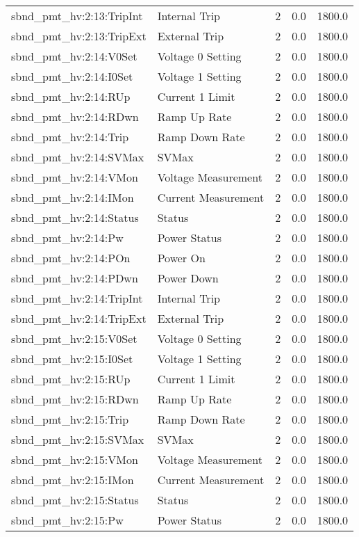 \begin{center}
\begin{longtable}{l | l l l l }
sbnd\_pmt\_hv:2:13:TripInt & Internal Trip & 2 & 0.0 & 1800.0\\ 
sbnd\_pmt\_hv:2:13:TripExt & External Trip & 2 & 0.0 & 1800.0\\ 
sbnd\_pmt\_hv:2:14:V0Set & Voltage 0 Setting & 2 & 0.0 & 1800.0\\ 
sbnd\_pmt\_hv:2:14:I0Set & Voltage 1 Setting & 2 & 0.0 & 1800.0\\ 
sbnd\_pmt\_hv:2:14:RUp & Current 1 Limit & 2 & 0.0 & 1800.0\\ 
sbnd\_pmt\_hv:2:14:RDwn & Ramp Up Rate & 2 & 0.0 & 1800.0\\ 
sbnd\_pmt\_hv:2:14:Trip & Ramp Down Rate & 2 & 0.0 & 1800.0\\ 
sbnd\_pmt\_hv:2:14:SVMax & SVMax & 2 & 0.0 & 1800.0\\ 
sbnd\_pmt\_hv:2:14:VMon & Voltage Measurement & 2 & 0.0 & 1800.0\\ 
sbnd\_pmt\_hv:2:14:IMon & Current Measurement & 2 & 0.0 & 1800.0\\ 
sbnd\_pmt\_hv:2:14:Status & Status & 2 & 0.0 & 1800.0\\ 
sbnd\_pmt\_hv:2:14:Pw & Power Status & 2 & 0.0 & 1800.0\\ 
sbnd\_pmt\_hv:2:14:POn & Power On & 2 & 0.0 & 1800.0\\ 
sbnd\_pmt\_hv:2:14:PDwn & Power Down & 2 & 0.0 & 1800.0\\ 
sbnd\_pmt\_hv:2:14:TripInt & Internal Trip & 2 & 0.0 & 1800.0\\ 
sbnd\_pmt\_hv:2:14:TripExt & External Trip & 2 & 0.0 & 1800.0\\ 
sbnd\_pmt\_hv:2:15:V0Set & Voltage 0 Setting & 2 & 0.0 & 1800.0\\ 
sbnd\_pmt\_hv:2:15:I0Set & Voltage 1 Setting & 2 & 0.0 & 1800.0\\ 
sbnd\_pmt\_hv:2:15:RUp & Current 1 Limit & 2 & 0.0 & 1800.0\\ 
sbnd\_pmt\_hv:2:15:RDwn & Ramp Up Rate & 2 & 0.0 & 1800.0\\ 
sbnd\_pmt\_hv:2:15:Trip & Ramp Down Rate & 2 & 0.0 & 1800.0\\ 
sbnd\_pmt\_hv:2:15:SVMax & SVMax & 2 & 0.0 & 1800.0\\ 
sbnd\_pmt\_hv:2:15:VMon & Voltage Measurement & 2 & 0.0 & 1800.0\\ 
sbnd\_pmt\_hv:2:15:IMon & Current Measurement & 2 & 0.0 & 1800.0\\ 
sbnd\_pmt\_hv:2:15:Status & Status & 2 & 0.0 & 1800.0\\ 
sbnd\_pmt\_hv:2:15:Pw & Power Status & 2 & 0.0 & 1800.0\\ 

\end{longtable}
\end{center}
